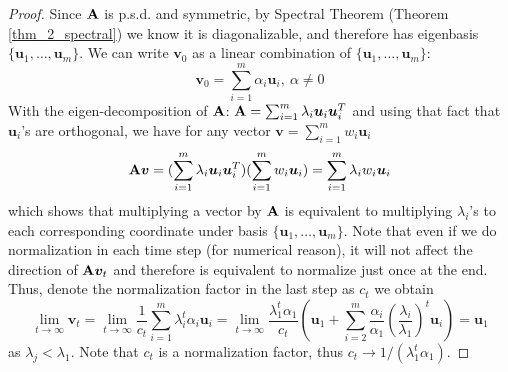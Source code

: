 \documentclass[../book-template.tex]{subfiles}
\begin{document}
\begin{proof}
Since ${\bf A}$ is p.s.d. and symmetric, by Spectral Theorem (Theorem \ref{thm_2_spectral}) we know it is diagonalizable, and therefore has eigenbasis $\{\bm{u}_1,\dots,\bm{u}_m\}$. We can write $\bm{v}_0$ as a linear combination of $\{\bm{u}_1,\dots,\bm{u}_m\}$:
\begin{equation*}
    \bm{v}_0 = \sum_{i=1}^{m} \alpha_i \bm{u}_i,\ \alpha\neq0
\end{equation*}
With the eigen-decomposition of ${\bf A}$: ${\bf A}= \sum_{i=1}^m \lambda_i\bm{u}_i\bm{u}_i^T $ and using that fact that $\bm{u}_i$'s are orthogonal, we have for any vector $\bm{v} = \sum_{i=1}^{m} w_i \bm{u}_i$
\begin{equation*}
    {\bf A}\bm{v} = (\sum_{i=1}^m \lambda_i\bm{u}_i\bm{u}_i^T)(\sum_{i=1}^{m} w_i \bm{u}_i) = \sum_{i=1}^{m} \lambda_i w_i \bm{u}_i
\end{equation*}
which shows that multiplying a vector by ${\bf A}$ is equivalent to multiplying $\lambda_i$'s to each corresponding coordinate under basis $\{\bm{u}_1,\dots,\bm{u}_m\}$. Note that even if we do normalization in each time step (for numerical reason), it will not affect the direction of ${\bf A}\bm{v}_t$ and therefore is equivalent to normalize just once at the end. Thus, denote the normalization factor in the last step as $c_t$ we obtain
\begin{equation*}
    \lim_{t\rightarrow \infty}\bm{v}_t = \lim_{t\rightarrow \infty}\frac{1}{c_t}\sum_{i=1}^{m} \lambda_i^t \alpha_i \bm{u}_i = \lim_{t\rightarrow \infty}\frac{\lambda_1^t\alpha_1}{c_t} \left(\bm{u}_1 + \sum_{i=2}^{m} \frac{\alpha_i}{\alpha_1}\left(\frac{\lambda_i}{\lambda_1}\right)^t\bm{u}_i\right) = \bm{u}_1
\end{equation*}
as $\lambda_j<\lambda_1$. Note that $c_t$ is a normalization factor, thus $c_t\rightarrow 1/(\lambda_1^t\alpha_1)$.
\end{proof}
\end{document}
